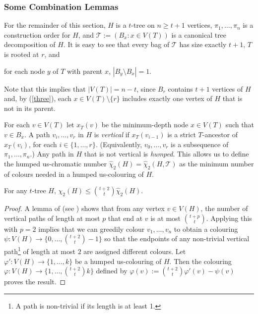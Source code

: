 \documentclass[kpfonts]{patmorin}
\newcommand{\uqs}{\chi_2}
\newcommand{\hus}{\hat{\chi}_2}
\theoremstyle{named}
\begin{document}
\subsubsection{Some Combination Lemmas}

For the remainder of this section, $H$ is a $t$-tree on $n\ge t+1$ vertices, $\pi_1,\ldots,\pi_n$ is a construction order for $H$, and $\mathcal{T}:=(B_x:x\in V(T))$ is a canonical tree decomposition of $H$.  It is easy to see that every bag of $\mathcal{T}$ has size exactly $t+1$, $T$ is rooted at $r$, and
\begin{inparaenum}[(i)]\setcounter{enumi}{2}
  \item for each node $y$ of $T$ with parent $x$, $|B_y\setminus B_x|=1$.\label{three}
\end{inparaenum}
Note that this implies that $|V(T)|=n-t$, since $B_r$ contains $t+1$ vertices of $H$ and, by (\ref{three}), each $x\in V(T)\setminus\{r\}$ includes exactly one vertex of $H$ that is not in its parent.

For each $v\in V(T)$ let $x_T(v)$ be the minimum-depth node $x\in V(T)$ such that $v\in B_x$.  A path $v_i,\ldots,v_r$ in $H$ is \emph{vertical} if $x_T(v_{i-1})$ is a strict $T$-ancestor of $x_T(v_i)$, for each $i\in\{1,\ldots,r\}$. (Equivalently, $v_0,\ldots,v_r$ is a subsequence of $\pi_1,\ldots,\pi_n$.) Any path in $H$ that is not vertical is \emph{humped}.  This allows us to define the humped us-chromatic number $\hus(H)=\hus(H,\mathcal{T})$ as the minimum number of colours needed in a humped us-colouring of $H$.

\begin{lem}\label{humped}
    For any $t$-tree $H$, $\uqs(H)\le \binom{t+2}{t}\hus(H)$.
\end{lem}

\begin{proof}
    A lemma of \citet{pilipczuk.siebertz:polynomial} (see \cite[Lemma~13]{pilipczuk.siebertz:polynomial-arxiv}) shows that from any vertex $v\in V(H)$, the number of vertical paths of length at most $p$ that end at $v$ is at most $\binom{t+p}{t}$.  Applying this with $p=2$ implies that we can greedily colour $v_1,\ldots,v_n$ to obtain a colouring $\psi:V(H)\to \{0,\ldots,\binom{t+2}{t}-1\}$ so that the endpoints of any non-trivial vertical path\footnote{A path is non-trivial if its length is at least 1.} of length at most $2$ are assigned different colours.  Let $\varphi':V(H)\to\{1,\ldots,k\}$ be a humped us-colouring of $H$.  Then the colouring $\varphi:V(H)\to\{1,\ldots,\binom{t+2}{t}k\}$ defined by $\varphi(v):=\binom{t+2}{t}\varphi'(v)-\psi(v)$ proves the result.
\end{proof}
\end{document}
